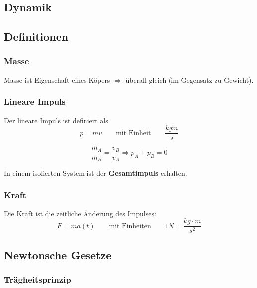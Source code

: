\documentclass[7pt]{article}
\begin{document}
\begin{multicols*}{3}

\section{Dynamik}

\subsection{Definitionen}

\subsubsection{Masse}

Masse ist Eigenschaft eines Köpers $\Rightarrow$ überall gleich (im Gegensatz zu Gewicht).

\subsubsection{Lineare Impuls}

Der lineare Impuls ist definiert als
\begin{equation*}
	p = mv \qquad\text{mit Einheit}\qquad \frac{kg\dot m}{s}
\end{equation*}

\begin{equation*}
	\frac{m_A}{m_B} = \frac{v_B}{v_A} \Rightarrow p_A + p_B = 0
\end{equation*}

In einem isolierten System ist der \textbf{Gesamtimpuls} erhalten.

\subsubsection{Kraft}

Die Kraft ist die zeitliche Änderung des Impulses:
\begin{equation*}
	F = ma(t) \qquad\text{mit Einheiten}\qquad 1N = \frac{kg\cdot m}{s^2}
\end{equation*}

\subsection{Newtonsche Gesetze}

\subsubsection{Trägheitsprinzip}


\end{multicols*}
\end{document}
